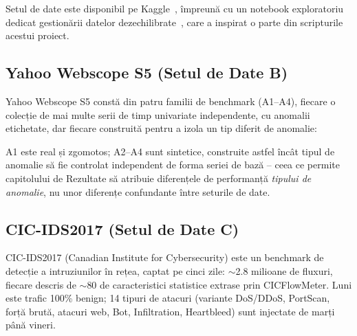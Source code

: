 Setul de date este disponibil pe Kaggle~\cite{kaggle_creditcard}, împreună cu un notebook exploratoriu dedicat gestionării datelor dezechilibrate~\cite{kaggle_janiobachmann}, care a inspirat o parte din scripturile acestui proiect.

\subsection{Yahoo Webscope S5 (Setul de Date B)}

Yahoo Webscope S5 constă din patru familii de benchmark (A1--A4), fiecare o colecție de mai multe serii de timp univariate independente, cu anomalii etichetate, dar fiecare construită pentru a izola un tip diferit de anomalie:

\begin{center}
\end{center}

A1 este real și zgomotos; A2--A4 sunt sintetice, construite astfel încât tipul de anomalie să fie controlat independent de forma seriei de bază -- ceea ce permite capitolului de Rezultate să atribuie diferențele de performanță \emph{tipului de anomalie}, nu unor diferențe confundante între seturile de date.

\subsection{CIC-IDS2017 (Setul de Date C)}

CIC-IDS2017 (Canadian Institute for Cybersecurity) este un benchmark de detecție a intruziunilor în rețea, captat pe cinci zile: $\sim$2.8 milioane de fluxuri, fiecare descris de $\sim$80 de caracteristici statistice extrase prin CICFlowMeter. Luni este trafic 100\% benign; 14 tipuri de atacuri (variante DoS/DDoS, PortScan, forță brută, atacuri web, Bot, Infiltration, Heartbleed) sunt injectate de marți până vineri.

